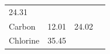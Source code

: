 \begin{enumerate}[noitemsep, label=\textbf{\arabic*}. ]
{\begin{center}
\begin{xtabular*}{\mytablewidth}[t]{|p{10\mystarwidth}|p{10\mystarwidth}|p{10\mystarwidth}|p{10\mystarwidth}|}
    
        24.31 &
    
    
     \tabularnewline{}
    
    
        Carbon &
    
    
        12.01 &
    
    
        24.02 &
    
    
     \tabularnewline{}
    
    
        Chlorine &
    
    
        35.45 &
    

\end{xtabular*}
\end{center}}
\end{enumerate}
